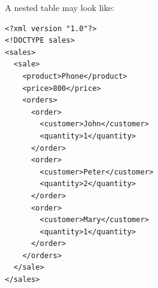 A nested table may look like:

\begin{lstlisting}[style=xml, caption={Example XML code}, label={lst:xml10}]
<?xml version "1.0"?>
<!DOCTYPE sales>
<sales>
  <sale>
    <product>Phone</product>
    <price>800</price>
    <orders>
      <order>
        <customer>John</customer>
        <quantity>1</quantity>
      </order>
      <order>
        <customer>Peter</customer>
        <quantity>2</quantity>
      </order>
      <order>
        <customer>Mary</customer>
        <quantity>1</quantity>
      </order>
    </orders>
  </sale>
</sales>
\end{lstlisting}
